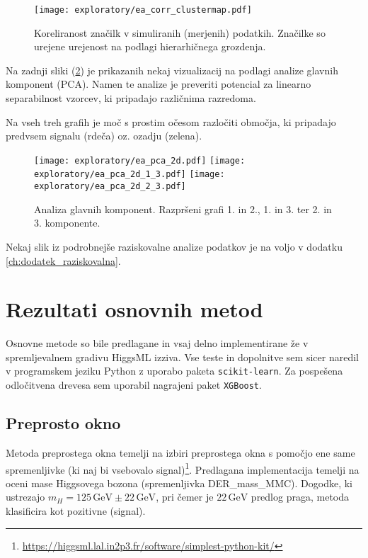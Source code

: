 \documentclass[11pt,a4paper,openany]{book}
\begin{document}
\begin{figure}[ht]
	\centering
	\texttt{[image: exploratory/ea\_corr\_clustermap.pdf]}
	\caption{Koreliranost značilk v simuliranih (merjenih) podatkih. Značilke so urejene urejenost na podlagi hierarhičnega grozdenja.}
	\label{sl:corr_clust_matrix}
\end{figure}

Na zadnji sliki (\ref{sl:pca}) je prikazanih nekaj vizualizacij na podlagi analize glavnih komponent (PCA). Namen te analize je preveriti potencial za linearno separabilnost vzorcev, ki pripadajo različnima razredoma. 


Na vseh treh grafih je moč s prostim očesom razločiti območja, ki pripadajo predvsem signalu (rdeča) oz. ozadju (zelena).

\begin{figure}[h]	
	\texttt{[image: exploratory/ea\_pca\_2d.pdf]}
	\texttt{[image: exploratory/ea\_pca\_2d\_1\_3.pdf]}
	\texttt{[image: exploratory/ea\_pca\_2d\_2\_3.pdf]}		
	
	\caption{Analiza glavnih komponent. Razpršeni grafi 1. in 2., 1. in 3. ter 2. in 3. komponente.}
	\label{sl:pca}
\end{figure}

Nekaj slik iz podrobnejše raziskovalne analize podatkov je na voljo v dodatku \ref{ch:dodatek_raziskovalna}.

	
\chapter{Rezultati osnovnih metod}

Osnovne metode so bile predlagane in vsaj delno implementirane že v spremljevalnem gradivu HiggsML izziva. Vse teste in dopolnitve sem sicer naredil v programskem jeziku Python z uporabo paketa \texttt{scikit-learn}\cite{scikit-learn}. Za pospešena odločitvena drevesa sem uporabil nagrajeni paket \texttt{XGBoost}\cite{chen2014}.

	
\section{Preprosto okno}

Metoda preprostega okna temelji na izbiri preprostega okna s pomočjo ene same spremenljivke (ki naj bi vsebovalo signal)\footnote{\url{https://higgsml.lal.in2p3.fr/software/simplest-python-kit/}}. Predlagana implementacija temelji na oceni mase Higgsovega bozona (spremenljivka DER\_mass\_MMC). Dogodke, ki ustrezajo $m_H = 125\,\text{GeV} \pm 22\,\text{GeV}$, pri čemer je $22\,\text{GeV}$ predlog praga, metoda klasificira kot pozitivne (signal).
\end{document}
